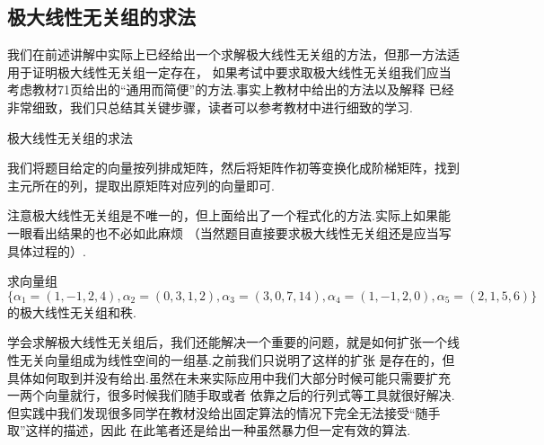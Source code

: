 \subsection{极大线性无关组的求法}
我们在前述讲解中实际上已经给出一个求解极大线性无关组的方法，但那一方法适用于证明极大线性无关组一定存在，
如果考试中要求取极大线性无关组我们应当考虑教材71页给出的``通用而简便''的方法.事实上教材中给出的方法以及解释
已经非常细致，我们只总结其关键步骤，读者可以参考教材中进行细致的学习.
\begin{lemma}
    极大线性无关组的求法

    我们将题目给定的向量按列排成矩阵，然后将矩阵作初等变换化成阶梯矩阵，找到主元所在的列，提取出原矩阵对应列的向量即可.
\end{lemma}

注意极大线性无关组是不唯一的，但上面给出了一个程式化的方法.实际上如果能一眼看出结果的也不必如此麻烦
（当然题目直接要求极大线性无关组还是应当写具体过程的）.
\begin{example}\label{ex:3:求解极大线性无关组}
	求向量组
    \[\{\alpha_1=(1,-1,2,4),\alpha_2=(0,3,1,2),\alpha_3=(3,0,7,14),\alpha_4=(1,-1,2,0),\alpha_5=(2,1,5,6)\}\]
	的极大线性无关组和秩.
\end{example}
\begin{solution}

\end{solution}

学会求解极大线性无关组后，我们还能解决一个重要的问题，就是如何扩张一个线性无关向量组成为线性空间的一组基.之前我们只说明了这样的扩张
是存在的，但具体如何取到并没有给出.虽然在未来实际应用中我们大部分时候可能只需要扩充一两个向量就行，很多时候我们随手取或者
依靠之后的行列式等工具就很好解决.但实践中我们发现很多同学在教材没给出固定算法的情况下完全无法接受``随手取''这样的描述，因此
在此笔者还是给出一种虽然暴力但一定有效的算法.

